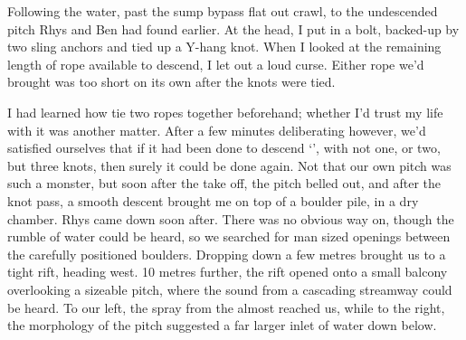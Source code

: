  Following the water, past the sump bypass flat out crawl, to the undescended pitch Rhys and Ben had found earlier. At the head, I put in a bolt, backed-up by two sling anchors and tied up a Y-hang knot. When I looked at the remaining length of rope available to descend, I let out a loud curse. Either rope we'd brought was too short on its own after the knots were tied.

    I had learned how tie two ropes together beforehand; whether I'd trust my life with it was another matter. After a few minutes deliberating however, we'd satisfied ourselves that if it had been done to descend `', with not one, or two, but three knots, then surely it could be done again. Not that our own pitch was such a monster, but soon after the take off, the pitch belled out, and after the knot pass, a smooth descent brought me on top of a boulder pile, in a dry chamber. Rhys came down soon after. There was no obvious way on, though the rumble of water could be heard, so we searched for man sized openings between the carefully positioned boulders. Dropping down a few metres brought us to a tight rift, heading west. 10 metres further, the rift opened onto a small balcony overlooking a sizeable pitch, where the sound from a cascading streamway could be heard. To our left, the spray from the  almost reached us, while to the right, the morphology of the pitch suggested a far larger inlet of water down below.




    


